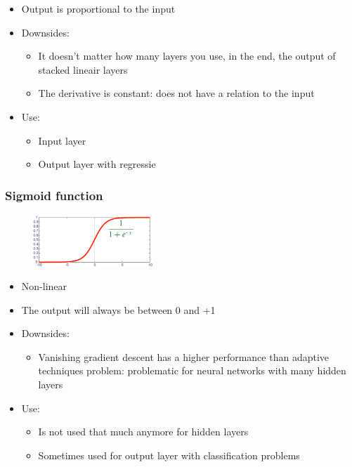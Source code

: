 \documentclass{article}
\begin{document}
\begin{itemize}
    \item Output is proportional to the input
    \item Downsides:
    \begin{itemize}
        \item It doesn't matter how many layers you use, in the end, the output of stacked lineair layers
        \item The derivative is constant: does not have a relation to the input
    \end{itemize}
    \item Use:
    \begin{itemize}
        \item Input layer
        \item Output layer with regressie
    \end{itemize}
\end{itemize}

\subsubsection{Sigmoid function}

\begin{figure}[H]
    \centering
    \includegraphics[width=0.4\textwidth]{sigmoid.png}
\end{figure}

\begin{itemize}
    \item Non-linear
    \item The output will always be between 0 and +1
    \item Downsides:
    \begin{itemize}
        \item Vanishing gradient descent has a higher performance than adaptive techniques problem: problematic for neural networks with many hidden layers
    \end{itemize}
    \item Use:
    \begin{itemize}
        \item Is not used that much anymore for hidden layers
        \item Sometimes used for output layer with classification problems
    \end{itemize}
\end{itemize}
\end{document}
